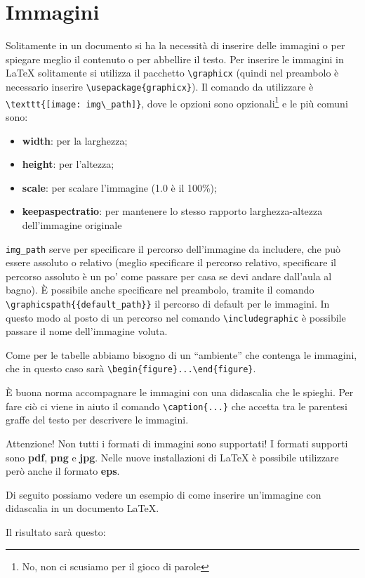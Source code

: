 \section{Immagini}
Solitamente in un documento si ha la necessità di inserire delle immagini o 
per spiegare meglio il contenuto o per abbellire il testo. Per inserire le 
immagini in \LaTeX{} solitamente si utilizza il pacchetto \verb!\graphicx! 
(quindi nel preambolo è necessario inserire \verb!\usepackage{graphicx}!). Il 
comando da utilizzare è \verb!\texttt{[image: img\_path]}!, dove le 
opzioni sono opzionali\footnote{No, non ci scusiamo per il gioco di parole} e 
le più comuni sono:
\begin{itemize}
    \item \textbf{width}: per la larghezza;
    \item \textbf{height}: per l'altezza;
    \item \textbf{scale}: per scalare l'immagine (1.0 è il 100\%);
    \item \textbf{keepaspectratio}: per mantenere lo stesso rapporto 
    larghezza-altezza dell’immagine originale
\end{itemize}
\verb!img_path! serve per specificare il percorso dell'immagine da includere, 
che può essere assoluto o relativo (meglio specificare il percorso relativo, 
specificare il percorso assoluto è un po' come passare per casa se devi andare 
dall'aula al bagno). È possibile anche specificare nel preambolo, tramite il 
comando \verb!\graphicspath{{default_path}}! il percorso di default per le 
immagini. In questo modo al posto di un percorso nel comando 
\verb!\includegraphic! è possibile passare il nome dell'immagine voluta.

Come per le tabelle abbiamo bisogno di un ``ambiente'' che contenga le 
immagini, che in questo caso sarà \verb!\begin{figure}...\end{figure}!.

È buona norma accompagnare le immagini con una didascalia che le spieghi. Per 
fare ciò ci viene in aiuto il comando \verb!\caption{...}! che accetta tra le 
parentesi graffe del testo per descrivere le immagini.

Attenzione! Non tutti i formati di immagini sono supportati! I formati 
supporti sono \textbf{pdf}, \textbf{png} e \textbf{jpg}. Nelle nuove 
installazioni di \LaTeX{} è possibile utilizzare però anche il formato \textbf{
eps}.

Di seguito possiamo vedere un esempio di come inserire un'immagine con 
didascalia in un documento \LaTeX{}.

Il risultato sarà questo:


